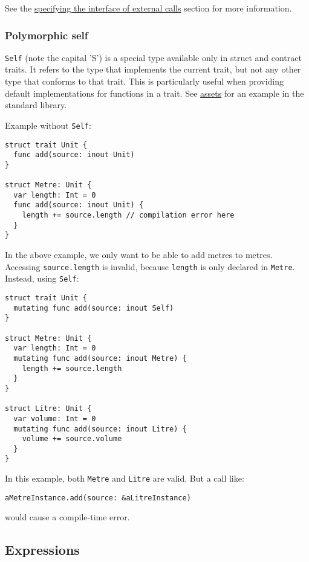 See the \hyperref[sec:appendix-b-specifying-the-interface]{specifying the interface of external calls} section for more information.

\subsubsection{Polymorphic self}
\label{sec:appendix-b-polymorphic-self}

\texttt{Self} (note the capital 'S') is a special type available only in struct and contract traits. It refers to the type that implements the current trait, but not any other type that conforms to that trait. This is particularly useful when providing default implementations for functions in a trait. See \hyperref[sec:appendix-b-assets]{assets} for an example in the standard library.

Example without \texttt{Self}:

\begin{verbatim}
struct trait Unit {
  func add(source: inout Unit)
}

struct Metre: Unit {
  var length: Int = 0
  func add(source: inout Unit) {
    length += source.length // compilation error here
  }
}
\end{verbatim}

In the above example, we only want to be able to add metres to metres. Accessing \texttt{source.length} is invalid, because \texttt{length} is only declared in \texttt{Metre}. Instead, using \texttt{Self}:

\begin{verbatim}
struct trait Unit {
  mutating func add(source: inout Self)
}

struct Metre: Unit {
  var length: Int = 0
  mutating func add(source: inout Metre) {
    length += source.length
  }
}

struct Litre: Unit {
  var volume: Int = 0
  mutating func add(source: inout Litre) {
    volume += source.volume
  }
}
\end{verbatim}

In this example, both \texttt{Metre} and \texttt{Litre} are valid. But a call like:

\texttt{aMetreInstance.add(source: &aLitreInstance)}

would cause a compile-time error.


\subsection{Expressions}
\label{sec:appendix-b-expressions}

